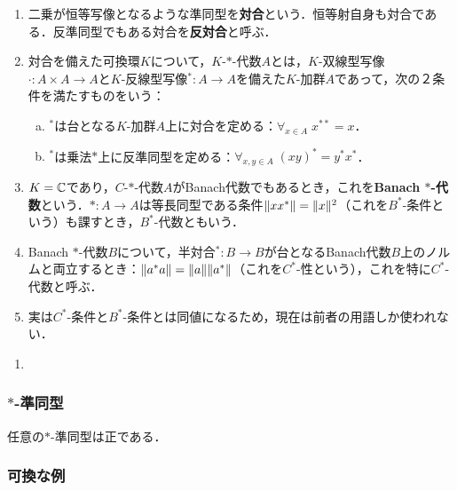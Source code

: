 \documentclass[uplatex,dvipdfmx]{jsreport}
\begin{document}
\begin{definition}\mbox{}
    \begin{enumerate}
        \item 二乗が恒等写像となるような準同型を\textbf{対合}という．恒等射自身も対合である．反準同型でもある対合を\textbf{反対合}と呼ぶ．
        \item 対合を備えた可換環$K$について，$K$-$*$-代数$A$とは，$K$-双線型写像$\cdot:A\times A\to A$と$K$-反線型写像${}^*:A\to A$を備えた$K$-加群$A$であって，次の２条件を満たすものをいう：
        \begin{enumerate}[(a)]
            \item ${}^*$は台となる$K$-加群$A$上に対合を定める：$\forall_{x\in A}\;x^{**}=x$．
            \item ${}^*$は乗法$*$上に反準同型を定める：$\forall_{x,y\in A}\;(xy)^*=y^*x^*$．
        \end{enumerate}
        \item $K=\mathbb{C}$であり，$C$-$*$-代数$A$がBanach代数でもあるとき，これを\textbf{Banach $*$-代数}という．$*:A\to A$は等長同型である条件$\|xx^*\|=\|x\|^2$（これを$B^*$-条件という）も課すとき，$B^*$-代数ともいう．
        \item Banach $*$-代数$B$について，半対合${}^*:B\to B$が台となるBanach代数$B$上のノルムと両立するとき：$\|a^*a\|=\|a\|\|a^*\|$（これを$C^*$-性という），これを特に$C^*$-代数と呼ぶ．
        \item 実は$C^*$-条件と$B^*$-条件とは同値になるため，現在は前者の用語しか使われない．
    \end{enumerate}
\end{definition}

\begin{example}\mbox{}
    \begin{enumerate}
        \item 
    \end{enumerate}
\end{example}

\subsubsection{$*$-準同型}

\begin{lemma}
    任意の$*$-準同型は正である．
\end{lemma}

\subsubsection{可換な例}
\end{document}
